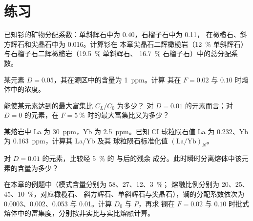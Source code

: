 \section{练习}

\begin{exercise}[$\star$]\label{exo:b3:trace-element-modelling:1}
已知钐的矿物分配系数：单斜辉石中为 0.40，石榴子石中为 0.11，
在橄榄石、斜方辉石和尖晶石中为 0.016。计算钐在
本章尖晶石二辉橄榄岩（\qty{12}{\percent} 单斜辉石）
与石榴子石二辉橄榄岩（\qty{19.5}{\percent} 单斜辉石、
\qty{16.7}{\percent} 石榴子石）中的总分配系数。
\end{exercise}

\begin{exercise}[$\star$]\label{exo:b3:trace-element-modelling:2}
某元素 $D = 0.05$，其在源区中的含量为 \qty{1}{ppm}。计算
其在 $F = 0.02$ 与 $0.10$ 时熔体中的浓度。
\end{exercise}

\begin{exercise}[$\star$]\label{exo:b3:trace-element-modelling:3}
能使某元素达到的最大富集比 $C_L/C_0$ 为多少？
对 $D = 0.01$ 的元素而言；对 $D = 0$ 的元素，在
$F = \qty{5}{\percent}$ 时的最大富集比又为多少？
\end{exercise}

\begin{exercise}[$\star$]\label{exo:b3:trace-element-modelling:4}
某熔岩中 La 为 \qty{30}{ppm}，Yb 为 \qty{2.5}{ppm}。已知 CI 球粒陨石值
La 为 0.232、Yb 为 \qty{0.163}{ppm}，计算其 La/Yb 及其
球粒陨石标准化值 $(\mathrm{La}/\mathrm{Yb})_N$。
\end{exercise}

\begin{exercise}[$\star\star$]\label{exo:b3:trace-element-modelling:5}
对 $D = 0.01$ 的元素，比较经 \qty{5}{\percent} 的
与后的残余
成分。此时瞬时分离熔体中该元素的含量为多少？
\end{exercise}

\begin{exercise}[$\star\star$]\label{exo:b3:trace-element-modelling:6}
在本章的例题中（模式含量分别为 58、27、12、\qty{3}{\percent}；
熔融比例分别为 20、25、45、\qty{10}{\percent}，对应橄榄石、
斜方辉石、单斜辉石与尖晶石），镧的分配系数依次为
0.0003、0.002、0.053 与 0.01。计算 $D_0$ 与 $P$，再求
镧在 $F = 0.02$ 与 $0.10$ 时批式熔体中的富集度，分别按非实比与实比熔融计算。
\end{exercise}

